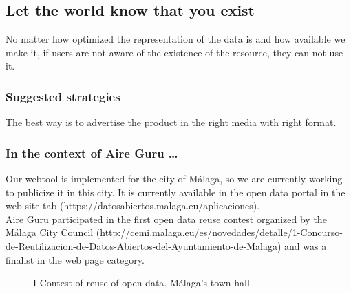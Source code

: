 \subsection{Let the world know that you exist}

No matter how optimized the representation of the data is and how available we make it, if users are not aware
of the existence of the resource, they can not use it.

\subsubsection*{Suggested strategies} 

The best way is to advertise the product in the right media with right format.

\subsubsection*{In the context of Aire Guru \ldots}

Our webtool is implemented for the city of Málaga, so we are currently working to publicize it in this city.
It is currently available in the open data portal in the web site tab (https://datosabiertos.malaga.eu/aplicaciones). \\

Aire Guru participated in the first open data reuse contest organized by the Málaga City Council (http://cemi.malaga.eu/es/novedades/detalle/1-Concurso-de-Reutilizacion-de-Datos-Abiertos-del-Ayuntamiento-de-Malaga)
and was a finalist in the web page category.

\begin{figure}[ht]
    \centering
    \hfill
    \caption{I Contest of reuse of open data. Málaga's town hall}
\end{figure}